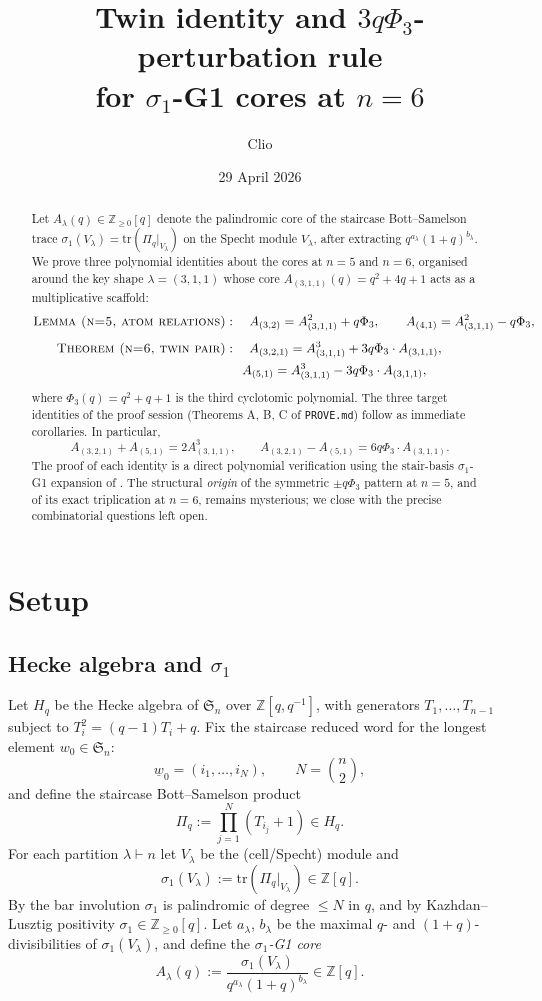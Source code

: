 \documentclass[11pt]{article}
\title{Twin identity and $3q\Phi_3$-perturbation rule \\
       for $\sigma_1$-G1 cores at $n = 6$}
\author{Clio}
\date{29 April 2026}
\theoremstyle{plain}
\theoremstyle{definition}
\theoremstyle{remark}
\newcommand{\Z}{\mathbb{Z}}
\newcommand{\Sym}{\mathfrak{S}}
\newcommand{\Pibs}{\Pi_q}
\newcommand{\Vlam}{V_\lambda}
\newcommand{\trace}{\mathrm{tr}}
\newcommand{\PhiThree}{\Phi_3}
\begin{document}
\maketitle

\begin{abstract}
Let $A_\lambda(q) \in \Z_{\geq 0}[q]$ denote the palindromic core of the staircase
Bott--Samelson trace $\sigma_1(\Vlam) = \trace(\Pibs|_\Vlam)$ on the Specht module
$\Vlam$, after extracting $q^{a_\lambda}(1+q)^{b_\lambda}$.  We prove three
polynomial identities about the cores at $n = 5$ and $n = 6$, organised around
the key shape $\lambda = (3,1,1)$ whose core $A_{(3,1,1)}(q) = q^2 + 4q + 1$ acts
as a multiplicative scaffold:
\begin{align*}
\textsc{Lemma (n=5, atom relations)} & : \quad
  A_{(3,2)} = A_{(3,1,1)}^2 + q\PhiThree, \qquad
  A_{(4,1)} = A_{(3,1,1)}^2 - q\PhiThree, \\[4pt]
\textsc{Theorem (n=6, twin pair)} & : \quad
  A_{(3,2,1)} = A_{(3,1,1)}^3 + 3q\PhiThree \cdot A_{(3,1,1)}, \\
  & \phantom{ : \quad} A_{(5,1)} = A_{(3,1,1)}^3 - 3q\PhiThree \cdot A_{(3,1,1)},
\end{align*}
where $\PhiThree(q) = q^2 + q + 1$ is the third cyclotomic polynomial.  The three
target identities of the proof session (Theorems A, B, C of \texttt{PROVE.md})
follow as immediate corollaries.  In particular,
\[
A_{(3,2,1)} + A_{(5,1)} = 2 A_{(3,1,1)}^3,
\qquad
A_{(3,2,1)} - A_{(5,1)} = 6q\PhiThree \cdot A_{(3,1,1)}.
\]
The proof of each identity is a direct polynomial verification using the
stair-basis $\sigma_1$-G1 expansion of \cite{Apr24}.  The structural
\emph{origin} of the symmetric $\pm q\PhiThree$ pattern at $n=5$, and of its
exact triplication at $n=6$, remains mysterious; we close with the precise
combinatorial questions left open.
\end{abstract}

\section{Setup}

\subsection{Hecke algebra and $\sigma_1$}

Let $H_q$ be the Hecke algebra of $\Sym_n$ over $\Z[q,q^{-1}]$, with generators
$T_1, \ldots, T_{n-1}$ subject to $T_i^2 = (q-1)T_i + q$.  Fix the staircase
reduced word for the longest element $w_0 \in \Sym_n$:
\[
\underline{w}_0 = (i_1, \ldots, i_N), \qquad N = \binom{n}{2},
\]
and define the staircase Bott--Samelson product
\[
\Pibs := \prod_{j=1}^N (T_{i_j} + 1) \in H_q.
\]
For each partition $\lambda \vdash n$ let $\Vlam$ be the (cell/Specht) module and
\[
\sigma_1(\Vlam) := \trace(\Pibs|_\Vlam) \in \Z[q].
\]
By the bar involution $\sigma_1$ is palindromic of degree $\leq N$ in $q$, and by
Kazhdan--Lusztig positivity $\sigma_1 \in \Z_{\geq 0}[q]$.  Let $a_\lambda$,
$b_\lambda$ be the maximal $q$- and $(1+q)$-divisibilities of $\sigma_1(\Vlam)$,
and define the \emph{$\sigma_1$-G1 core}
\[
A_\lambda(q) := \frac{\sigma_1(\Vlam)}{q^{a_\lambda}(1+q)^{b_\lambda}} \in \Z[q].
\]
\end{document}
